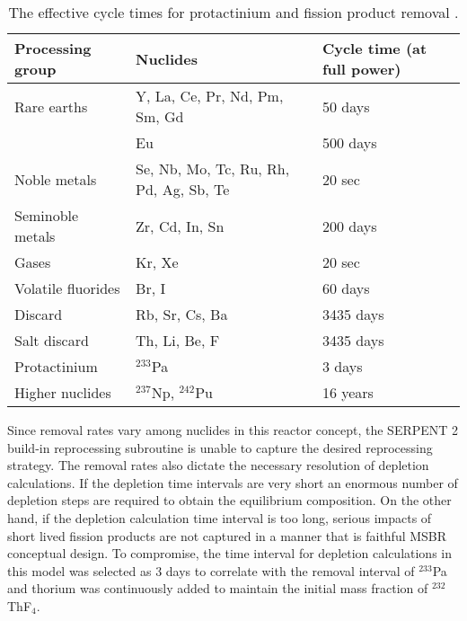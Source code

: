 \begin{table}[ht!]
        \centering
        \caption{The effective cycle times for protactinium and fission product removal \cite{robertson_conceptual_1971}.}
        \begin{tabular}{|m{} | m{}|m{}|}
        \hline 
        Processing group & \qquad\qquad\qquad Nuclides & Cycle time (at full power) \\ [5pt] \hline 
        Rare earths & Y, La, Ce, Pr, Nd, Pm, Sm, Gd & 50 days \\ [5pt] \hline 
        \qquad & Eu & 500 days \\ [5pt] \hline
        Noble metals & Se, Nb, Mo, Tc, Ru, Rh, Pd, Ag, Sb, Te & 20 sec \\ [5pt] \hline
        Seminoble metals & Zr, Cd, In, Sn & 200 days \\ [5pt] \hline
        Gases & Kr, Xe & 20 sec \\ [5pt] \hline
        Volatile fluorides & Br, I & 60 days \\ [5pt] \hline
        Discard & Rb, Sr, Cs, Ba & 3435 days \\ [5pt] \hline
        Salt discard & Th, Li, Be, F & 3435 days \\ [5pt] \hline
        Protactinium & $^{233}$Pa & 3 days \\ [5pt] \hline
        Higher nuclides & $^{237}$Np, $^{242}$Pu & 16 years \\ [5pt] \hline
        \end{tabular}
        \label{tab:reprocessing_list}
          \vspace{-0.9em}
\end{table}
Since removal rates vary among nuclides in this reactor concept, the SERPENT 2 build-in reprocessing subroutine is unable to capture the desired reprocessing strategy. The removal rates also dictate the necessary resolution of depletion calculations. If the depletion time intervals are very short an enormous number of depletion steps are required to obtain the equilibrium composition. On the other hand, if the depletion  calculation time interval is too long, serious impacts of short lived fission products are not captured in a manner that is faithful \gls{MSBR} conceptual design. To compromise, the time interval for depletion calculations in this model was selected as 3 days to correlate with the removal interval of $^{233}$Pa and thorium was continuously added to maintain the initial mass fraction of $^{232}$ThF$_4$.

